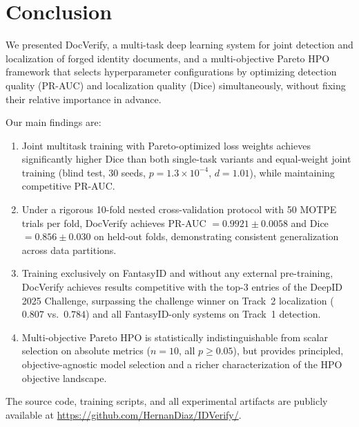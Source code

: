 
\section{Conclusion}
\label{sec:conclusion}

We presented DocVerify, a multi-task deep learning system for joint detection and
localization of forged identity documents, and a multi-objective Pareto HPO
framework that selects hyperparameter configurations by optimizing detection
quality (PR-AUC) and localization quality (Dice) simultaneously, without fixing
their relative importance in advance.

Our main findings are:

\begin{enumerate}
  \item Joint multitask training with Pareto-optimized loss weights achieves
  significantly higher Dice than both single-task variants and equal-weight
  joint training (blind test, 30 seeds, $p = 1.3 \times 10^{-4}$, $d = 1.01$),
  while maintaining competitive PR-AUC.

  \item Under a rigorous 10-fold nested cross-validation protocol with 50 MOTPE
  trials per fold, DocVerify achieves PR-AUC $= 0.9921 \pm 0.0058$ and
  Dice $= 0.856 \pm 0.030$ on held-out folds, demonstrating consistent
  generalization across data partitions.

  \item Training exclusively on FantasyID and without any external pre-training,
  DocVerify achieves results competitive with the top-3 entries of the
  DeepID 2025 Challenge, surpassing the challenge winner on Track~2
  localization ($0.807$ vs.\ $0.784$) and all FantasyID-only systems on
  Track~1 detection.

  \item Multi-objective Pareto HPO is statistically indistinguishable from
  scalar selection on absolute metrics ($n = 10$, all $p \geq 0.05$), but
  provides principled, objective-agnostic model selection and a richer
  characterization of the HPO objective landscape.
\end{enumerate}

The source code, training scripts, and all experimental artifacts are publicly
available at \url{https://github.com/HernanDiaz/IDVerify/}.

